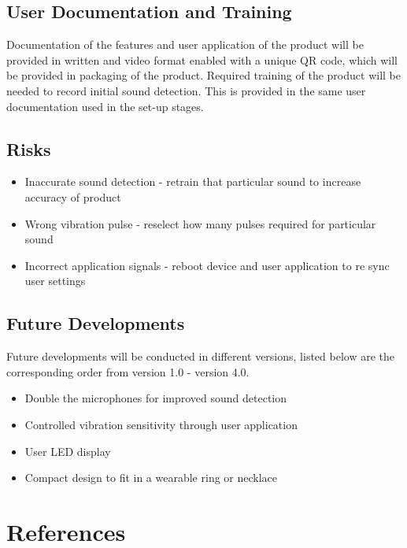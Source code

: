 \documentclass[12pt]{article}
\begin{document}
\raggedright

\subsection{User Documentation and Training}

Documentation of the features and user application of the product will be provided in written and video format enabled with a unique QR code, which will be provided in packaging of the product.
Required training of the product will be needed to record initial sound detection. This is provided in the same user documentation used in the set-up stages.

\subsection{Risks}

\begin{itemize}
  \item Inaccurate sound detection - retrain that particular sound to increase accuracy of product
  \item Wrong vibration pulse - reselect how many pulses required for particular sound
  \item Incorrect application signals - reboot device and user application to re sync user settings
\end{itemize}

\subsection{Future Developments}

Future developments will be conducted in different versions, listed below are the corresponding order from version 1.0 - version 4.0.

\begin{itemize}
  \item Double the microphones for improved sound detection
  \item Controlled vibration sensitivity through user application
  \item User LED display
  \item Compact design to fit in a wearable ring or necklace
\end{itemize}

\pagebreak

\section*{References}
\end{document}
